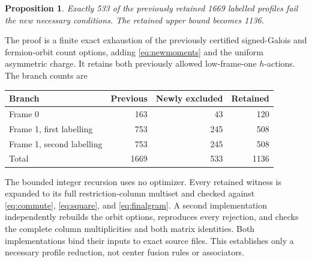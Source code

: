 \documentclass[10pt]{article}
\newtheorem{proposition}[theorem]{Proposition}
\begin{document}
\begin{proposition}
Exactly 533 of the previously retained 1669 labelled profiles fail the new necessary conditions. The retained upper bound becomes 1136.
\end{proposition}
The proof is a finite exact exhaustion of the previously certified signed-Galois and fermion-orbit count options, adding \eqref{eq:newmoments} and the uniform asymmetric charge. It retains both previously allowed low-frame-one $h$-actions. The branch counts are
\begin{center}
\begin{tabular}{lrrr}
\toprule
Branch&Previous&Newly excluded&Retained\\
\midrule
Frame 0&163&43&120\\
Frame 1, first labelling&753&245&508\\
Frame 1, second labelling&753&245&508\\
\midrule
Total&1669&533&1136\\
\bottomrule
\end{tabular}
\end{center}
The bounded integer recursion uses no optimizer. Every retained witness is expanded to its full restriction-column multiset and checked against \eqref{eq:commute}, \eqref{eq:square}, and \eqref{eq:finalgram}. A second implementation independently rebuilds the orbit options, reproduces every rejection, and checks the complete column multiplicities and both matrix identities. Both implementations bind their inputs to exact source files. This establishes only a necessary profile reduction, not center fusion rules or associators.
\end{document}
